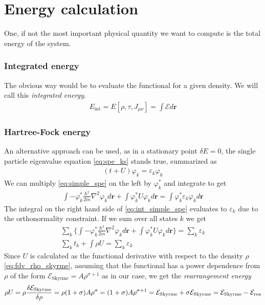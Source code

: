 \section{Energy calculation}
One, if not the most important physical quantity we want to compute is the total energy of the system.
\subsubsection{Integrated energy}
The obvious way would be to evaluate the functional for a given density. We will call this \textit{integrated energy}.
\begin{align*}
    E_\text{int} = E[\rho, \tau, J_{\mu\nu}]= \int \mathcal E d\mathbf r
\end{align*}
\subsubsection{Hartree-Fock energy}
An alternative approach can be used, as in a stationary point $\delta E = 0$, the single particle eigenvalue equation \eqref{eq:spe_ks} stands true, summarized as 
\begin{align}
    \label{eq:simple_spe}
    ( t + U)\varphi_k = \varepsilon_k \varphi_k
\end{align}
We can multiply \eqref{eq:simple_spe} on the left by $\varphi_k^*$ and integrate to get
\begin{align}
    \label{eq:int_simple_spe}
    \int -\varphi_k^* \frac{\hbar^2}{2m}\nabla^2\varphi_k d\bm r + \int \varphi_k^* U \varphi_k d\bm r = \int \varphi_k^* \varepsilon_k \varphi_k d\bm r
\end{align}
The integral on the right hand side of \eqref{eq:int_simple_spe} evaluates to $\varepsilon_k$ due to the orthonormality constraint. If we sum over all states $k$ we get
\begin{align}
    \sum_k \bigg\{\int -\varphi_k^* \frac{\hbar^2}{2m}\nabla^2\varphi_k d\bm r + \int \varphi_k^* U \varphi_k d\bm r \bigg\}= \sum_k \varepsilon_k 
    \\\sum_k t_k + \int \rho U = \sum_k \varepsilon_k \label{eq:sum_spe}
\end{align}
Since $U$ is calculated as the functional derivative with respect to the density $\rho$ \eqref{eq:fdv_rho_skyrme}, assuming that the functional has a power dependence from $\rho$ of the form $\mathcal E_\text{Skyrme} = A\rho^{\sigma+1}$ as in our case, we get the \textit{rearrangement energy}
\begin{align}
    \label{eq:sum_spe_new}
    \rho U = \rho \fdv{\mathcal E_\text{Skyrme}}{\rho} = \rho(1+\sigma )A \rho^\sigma = (1+\sigma)A \rho^{\sigma+1} = \mathcal E_\text{Skyrme} + \sigma \mathcal E_\text{Skyrme} = \mathcal E_\text{Skyrme} - \mathcal E_\text{rea}
\end{align}
